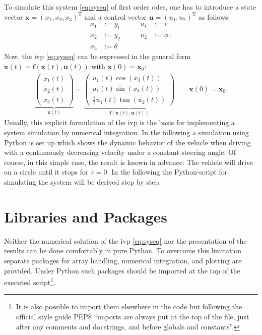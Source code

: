 \documentclass[a4paper,11pt,headinclude=true,headsepline,parskip=half,DIV=12]{scrartcl}
\newcommand{\uu}{\mathbf{u}}
\newcommand{\f}{\mathbf{f}}
\newcommand{\x}{\mathbf{x}}
\newcommand{\xZero}{\mathbf{x}_0}
\begin{document}
To simulate this system \eqref{eq:syseq} of first order \glspl{ode}, one has to introduce a state vector $\x=(x_1,x_2,x_3)^\mathrm{T}$ and a control vector $\uu=(u_1,u_2)^\mathrm{T}$ as follows:
\begin{subequations}
\begin{alignat}{2}
x_1 &:= y_1 &\qquad u_1 &:= v\\
x_2 &:= y_2 &\qquad  u_2 &:= \phi \:. \\
x_3 &:= \theta
\end{alignat}
\end{subequations}
Now, the \gls{ivp} \eqref{eq:syseq} can be expressed in the general form $\dot{\x}(t)=\f(\x(t),\uu(t))$ with $\x(0) = \xZero$:
\label{eq:ss_system}
\begin{align} \label{eq:odesys}
\underbrace{\begin{pmatrix} \dot{x}_1(t) \\ \dot{x}_2(t) \\ \dot{x}_3(t) \end{pmatrix}}_{\dot{\x}(t)} = \underbrace{\begin{pmatrix}  u_1(t) \cos(x_3(t)) \\ u_1(t) \sin(x_3(t)) \\ \frac{1}{l}u_1(t) \tan(u_2(t)) \end{pmatrix}}_{\f(\x(t),\uu(t))} \qquad \x(0) = \xZero.
\end{align}
Usually, this explicit formulation of the \gls{ivp} is the basis for implementing a system simulation by numerical integration. In the following a simulation using Python is set up which shows the dynamic behavior of the vehicle when driving with a continuously decreasing velocity under a constant steering angle. Of course, in this simple case, the result is known in advance: The vehicle will drive on a circle until it stops for $v = 0$. In the following the Python-script for simulating the system will be derived step by step.


\section{Libraries and Packages}
Neither the numerical solution of the \gls{ivp} \eqref{eq:syseq} nor the presentation of the results can be done comfortably in pure Python. To overcome this limitation separate packages for array handling, numerical integration, and plotting are provided. Under Python such packages should be imported at the top of the executed script\footnote{It is also possible to import them elsewhere in the code but following the official style guide PEP8 ``imports are always put at the top of the file, just after any comments and docstrings, and before globals and constants''.}.
\end{document}
